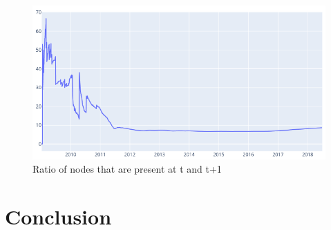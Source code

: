 \documentclass{Resources/netsci-project}
\begin{document}
\lipsum[2]

\begin{figure}[!htb]
    \centering
    \includegraphics[width=0.9\linewidth]{Resources/Ratio.png}
    \caption{Ratio of nodes that are present at t and t+1} 
\end{figure}

\lipsum[2]

\section{Conclusion}

\lipsum[2]

\newpage
\printbibliography
\end{document}
